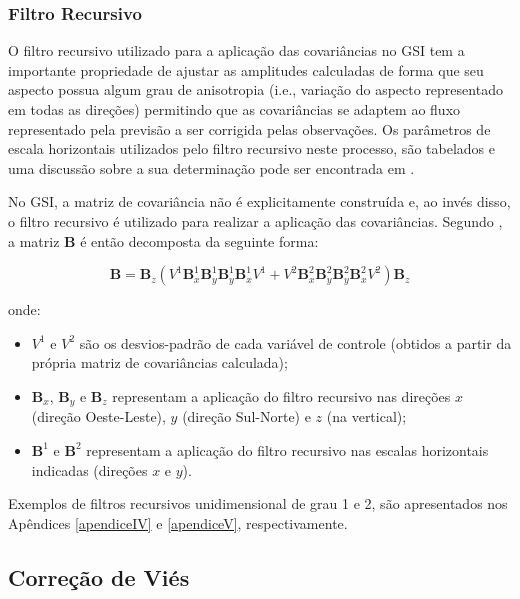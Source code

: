 \subsubsection*{Filtro Recursivo}

O filtro recursivo utilizado para a aplicação das covariâncias no GSI tem a importante propriedade de ajustar as amplitudes calculadas de forma que seu aspecto possua algum grau de anisotropia (i.e., variação do aspecto representado em todas as direções) permitindo que as covariâncias se adaptem ao fluxo representado pela previsão a ser corrigida pelas observações. Os parâmetros de escala horizontais utilizados pelo filtro recursivo neste processo, são tabelados e uma discussão sobre a sua determinação pode ser encontrada em .

No GSI, a matriz de covariância não é explicitamente construída e, ao invés disso, o filtro recursivo \cite{purseretal/2003a,purseratal/2003b} é utilizado para realizar a aplicação das covariâncias. Segundo , a matriz $\mathbf{B}$ é então decomposta da seguinte forma:

\begin{equation}
    \label{eq:aplicB}
    \mathbf{B} = \mathbf{B}_{z}(V^{1}\mathbf{B}^{1}_{x}\mathbf{B}^{1}_{y}\mathbf{B}^{1}_{y}\mathbf{B}^{1}_{x}V^{1} + V^{2}\mathbf{B}^{2}_{x}\mathbf{B}^{2}_{y}\mathbf{B}^{2}_{y}\mathbf{B}^{2}_{x}V^{2})\mathbf{B}_{z}
\end{equation}

onde:

\begin{itemize}
    \item $V^{1}$ e $V^{2}$ são os desvios-padrão de cada variável de controle (obtidos a partir da própria matriz de covariâncias calculada);
    \item $\mathbf{B}_{x}$, $\mathbf{B}_{y}$ e $\mathbf{B}_{z}$ representam a aplicação do filtro recursivo nas direções $x$ (direção Oeste-Leste), $y$ (direção Sul-Norte) e $z$ (na vertical);
    \item $\mathbf{B}^{1}$ e $\mathbf{B}^{2}$ representam a aplicação do filtro recursivo nas escalas horizontais indicadas (direções $x$ e $y$).
\end{itemize}

Exemplos de filtros recursivos unidimensional de grau 1 e 2, são apresentados nos Apêndices \ref{apendiceIV} e \ref{apendiceV}, respectivamente.

\subsection*{Correção de Viés}

